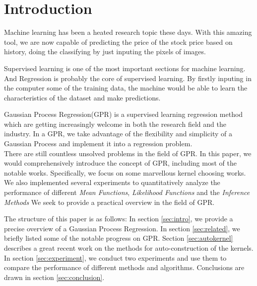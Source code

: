 \section{Introduction} \label{sec:introduction}

Machine learning has been a heated research topic these days. With this amazing tool, we are now capable of predicting the price of the stock price based on history, doing the classifying by just inputing the pixels of images.

Supervised learning is one of the most important sections for machine learning. And Regression is probably the core of supervised learning. By firstly inputing in the computer some of the training data, the machine would be able to learn the characteristics of the dataset and make predictions.

Gaussian Process Regression(GPR) is a supervised learning regression method which are getting increasingly welcome in both the research field and the industry. 
In a GPR, we take advantage of the flexibility and simplicity of a Gaussian Process and implement it into a regression problem. \\

There are still countless unsolved problems in the field of GPR.
In this paper, we would comprehensively introduce the concept of GPR, including most of the notable works.
Specifically, we focus on some marvellous kernel choosing works.
We also implemented several experiments to quantitatively analyze the performance of different \emph{Mean Functions}, \emph{Likelihood Functions} and the \emph{Inference Methods}
We seek to provide a practical overview in the field of GPR.

The structure of this paper is as follows: 
In section \ref{sec:intro}, we provide a precise overview of a Gaussian Process Regression. 
In section \ref{sec:related}, we briefly listed some of the notable progress on GPR.
Section \ref{sec:autokernel} describes a great recent work on the methods for auto-construction of the kernels.
In section \ref{sec:experiment}, we conduct two experiments and use them to compare the performance of different methods and algorithms.
Conclusions are drawn in section \ref{sec:conclusion}.

